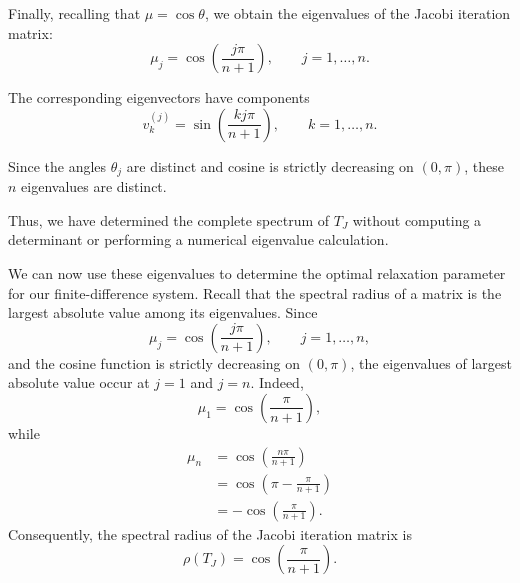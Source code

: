 \documentclass[11pt,a4paper]{article}
\theoremstyle{definition}
\theoremstyle{remark}
\begin{document}
Finally, recalling that
$\mu=\cos\theta$, we obtain the
eigenvalues of the Jacobi iteration
matrix:
\begin{equation}
    \boxed{
    \mu_j=
    \cos\left(\frac{j\pi}{n+1}\right),
    \qquad j=1,\ldots,n.
    }
    \label{eq:jacobi_fd_eigenvalues}
\end{equation}

The corresponding eigenvectors have
components
\begin{equation}
    \boxed{
    v_k^{(j)}
    =
    \sin\left(
        \frac{kj\pi}{n+1}
    \right),
    \qquad k=1,\ldots,n.
    }
\end{equation}

Since the angles $\theta_j$ are
distinct and cosine is strictly
decreasing on $(0,\pi)$, these
$n$ eigenvalues are distinct.

Thus, we have determined the
complete spectrum of $T_J$
without computing a determinant
or performing a numerical
eigenvalue calculation.

We can now use these eigenvalues to determine
the optimal relaxation parameter for our
finite-difference system. Recall that the
spectral radius of a matrix is the largest
absolute value among its eigenvalues. Since
\[
    \mu_j=
    \cos\left(\frac{j\pi}{n+1}\right),
    \qquad j=1,\ldots,n,
\]
and the cosine function is strictly decreasing
on $(0,\pi)$, the eigenvalues of largest
absolute value occur at $j=1$ and $j=n$.
Indeed,
\[
    \mu_1=
    \cos\left(\frac{\pi}{n+1}\right),
\]
while
\[
\begin{aligned}
    \mu_n
    &=
    \cos\left(\frac{n\pi}{n+1}\right)\\
    &=
    \cos\left(\pi-\frac{\pi}{n+1}\right)\\
    &=
    -\cos\left(\frac{\pi}{n+1}\right).
\end{aligned}
\]
Consequently, the spectral radius of the
Jacobi iteration matrix is
\begin{equation}
    \boxed{
    \rho(T_J)=
    \cos\left(\frac{\pi}{n+1}\right).
    }
    \label{eq:jacobi_fd_spectral_radius}
\end{equation}
\end{document}
